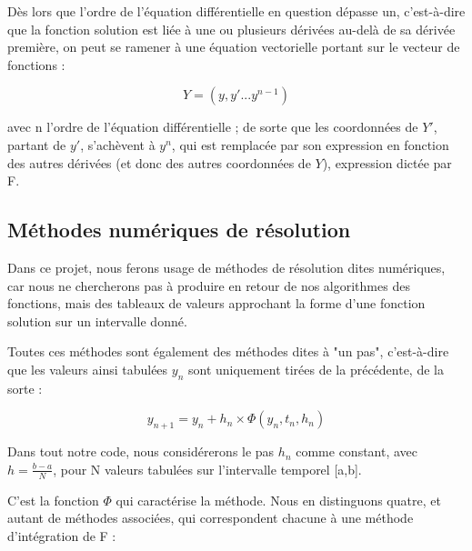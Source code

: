 \documentclass{article}
\begin{document}
Dès lors que l'ordre de l'équation différentielle en question dépasse un, c'est-à-dire que la fonction solution est liée à une ou plusieurs dérivées au-delà de sa dérivée première, on peut se ramener à une équation vectorielle portant sur le vecteur de fonctions :

$$Y=(y,y'...y^{n-1})$$

avec n l'ordre de l'équation différentielle ; de sorte que les coordonnées de $Y'$, partant de $y'$, s'achèvent à $y^n$, qui est remplacée par son expression en fonction des autres dérivées (et donc des autres coordonnées de $Y$), expression dictée par F.

\subsection{Méthodes numériques de résolution}

Dans ce projet, nous ferons usage de méthodes de résolution dites numériques, car nous ne chercherons pas à produire en retour de nos algorithmes des fonctions, mais des tableaux de valeurs approchant la forme d'une fonction solution sur un intervalle donné.

Toutes ces méthodes sont également des méthodes dites à "un pas", c'est-à-dire que les valeurs ainsi tabulées $y_n$ sont uniquement tirées de la précédente, de la sorte :

$$y_{n+1}=y_n+h_n \times \Phi(y_n,t_n,h_n)$$

Dans tout notre code, nous considérerons le pas $h_n$ comme constant, avec $h=\frac{b-a}{N}$, pour N valeurs tabulées sur l'intervalle temporel [a,b].

C'est la fonction $\Phi$ qui caractérise la méthode. Nous en distinguons quatre, et autant de méthodes associées, qui correspondent chacune à une méthode d'intégration de F :
\end{document}

